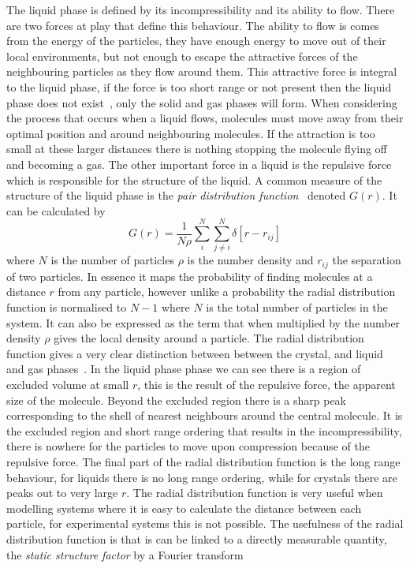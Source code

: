 The liquid phase is defined by its incompressibility and its ability to flow. There are two forces at play that define this behaviour. The ability to flow is comes from the energy of the particles, they have enough energy to move out of their local environments, but not enough to escape the attractive forces of the neighbouring particles as they flow around them. This attractive force is integral to the liquid phase, if the force is too short range or not present then the liquid phase does not exist~\tocite, only the solid and gas phases will form. When considering the process that occurs when a liquid flows, molecules must move away from their optimal position and around neighbouring molecules. If the attraction is too small at these larger distances there is nothing stopping the molecule flying off and becoming a gas. The other important force in a liquid is the repulsive force which is responsible for the structure of the liquid. A common measure of the structure of the liquid phase is the \emph{pair distribution function}~ denoted $G(r)$. It can be calculated by
\begin{equation}
    G(r) = \frac{1}{N\rho} \sum_i^N \sum_{j\ne i}^N \delta[ r - r_{ij}]
\end{equation}
where $N$ is the number of particles $\rho$ is the number density and $r_{ij}$ the separation of two particles. In essence it maps the probability of finding molecules at a distance $r$ from any particle, however unlike a probability the radial distribution function is normalised to $N-1$ where $N$ is the total number of particles in the system. It can also be expressed as the term that when multiplied by the number density $\rho$ gives the local density around a particle. The radial distribution function gives a very clear distinction between between the crystal, and liquid and gas phases~. In the liquid phase phase we can see there is a region of excluded volume at small $r$, this is the result of the repulsive force, the apparent size of the molecule. Beyond the excluded region there is a sharp peak corresponding to the shell of nearest neighbours around the central molecule. It is the excluded region and short range ordering that results in the incompressibility, there is nowhere for the particles to move upon compression because of the repulsive force. The final part of the radial distribution function is the long range behaviour, for liquids there is no long range ordering, while for crystals there are peaks out to very large $r$. The radial distribution function is very useful when modelling systems where it is easy to calculate the distance between each particle, for experimental systems this is not possible. The usefulness of the radial distribution function is that is can be linked to a directly measurable quantity, the \emph{static structure factor} by a Fourier transform
